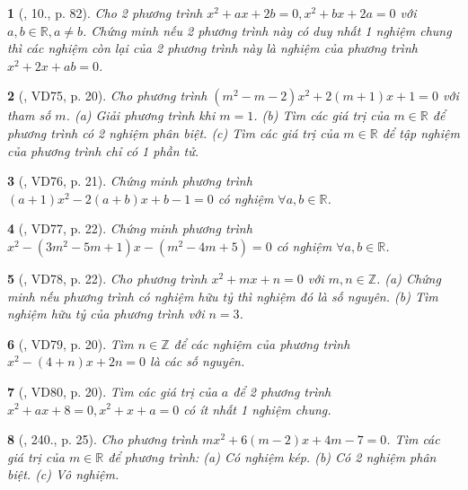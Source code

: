 \documentclass{article}
\newtheorem{baitoan}{}
\begin{document}
\begin{baitoan}[\cite{Thu_Viet_Minh_ptb2}, 10., p. 82]
	Cho 2 phương trình $x^2 + ax + 2b = 0,x^2 + bx + 2a = 0$ với $a,b\in\mathbb{R},a\ne b$. Chứng minh nếu 2 phương trình này có duy nhất 1 nghiệm chung thì các nghiệm còn lại của 2 phương trình này là nghiệm của phương trình $x^2 + 2x + ab = 0$.
\end{baitoan}

\begin{baitoan}[\cite{Binh_Toan_9_tap_2}, VD75, p. 20]
	Cho phương trình $(m^2 - m - 2)x^2 + 2(m + 1)x + 1 = 0$ với tham số $m$. (a) Giải phương trình khi $m = 1$. (b) Tìm các giá trị của $m\in\mathbb{R}$ để phương trình có 2 nghiệm phân biệt. (c) Tìm các giá trị của $m\in\mathbb{R}$ để tập nghiệm của phương trình chỉ có 1 phần tử.
\end{baitoan}

\begin{baitoan}[\cite{Binh_Toan_9_tap_2}, VD76, p. 21]
	Chứng minh phương trình $(a + 1)x^2 - 2(a + b)x + b - 1 = 0$ có nghiệm $\forall a,b\in\mathbb{R}$.
\end{baitoan}

\begin{baitoan}[\cite{Binh_Toan_9_tap_2}, VD77, p. 22]
	Chứng minh phương trình $x^2 - (3m^2 - 5m + 1)x - (m^2 - 4m + 5) = 0$ có nghiệm $\forall a,b\in\mathbb{R}$.
\end{baitoan}

\begin{baitoan}[\cite{Binh_Toan_9_tap_2}, VD78, p. 22]
	Cho phương trình $x^2 + mx + n = 0$ với $m,n\in\mathbb{Z}$. (a) Chứng minh nếu phương trình có nghiệm hữu tỷ thì nghiệm đó là số nguyên. (b) Tìm nghiệm hữu tỷ của phương trình với $n = 3$.
\end{baitoan}

\begin{baitoan}[\cite{Binh_Toan_9_tap_2}, VD79, p. 20]
	Tìm $n\in\mathbb{Z}$ để các nghiệm của phương trình $x^2 - (4 + n)x + 2n = 0$ là các số nguyên.
\end{baitoan}

\begin{baitoan}[\cite{Binh_Toan_9_tap_2}, VD80, p. 20]
	Tìm các giá trị của $a$ để 2 phương trình $x^2 + ax + 8 = 0,x^2 + x + a = 0$ có ít nhất 1 nghiệm chung.
\end{baitoan}

\begin{baitoan}[\cite{Binh_Toan_9_tap_2}, 240., p. 25]
	Cho phương trình $mx^2 + 6(m - 2)x + 4m - 7 = 0$. Tìm các giá trị của $m\in\mathbb{R}$ để phương trình: (a) Có nghiệm kép. (b) Có 2 nghiệm phân biệt. (c) Vô nghiệm.
\end{baitoan}
\end{document}
